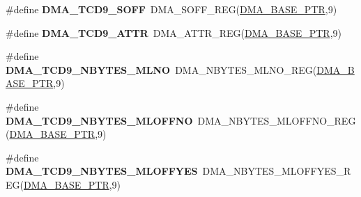 \begin{DoxyCompactItemize}
\item 
\hypertarget{group___d_m_a___register___accessor___macros_ga9fa3ee648910ce0b3f958f9fba8109bd}{}\#define {\bfseries D\+M\+A\+\_\+\+T\+C\+D9\+\_\+\+S\+O\+F\+F}~D\+M\+A\+\_\+\+S\+O\+F\+F\+\_\+\+R\+E\+G(\hyperlink{group___d_m_a___peripheral_ga6997fbc1b1973e9f27170217a3bd6f22}{D\+M\+A\+\_\+\+B\+A\+S\+E\+\_\+\+P\+T\+R},9)\label{group___d_m_a___register___accessor___macros_ga9fa3ee648910ce0b3f958f9fba8109bd}

\item 
\hypertarget{group___d_m_a___register___accessor___macros_gab5bfe174e41a010fa81140945c342ef9}{}\#define {\bfseries D\+M\+A\+\_\+\+T\+C\+D9\+\_\+\+A\+T\+T\+R}~D\+M\+A\+\_\+\+A\+T\+T\+R\+\_\+\+R\+E\+G(\hyperlink{group___d_m_a___peripheral_ga6997fbc1b1973e9f27170217a3bd6f22}{D\+M\+A\+\_\+\+B\+A\+S\+E\+\_\+\+P\+T\+R},9)\label{group___d_m_a___register___accessor___macros_gab5bfe174e41a010fa81140945c342ef9}

\item 
\hypertarget{group___d_m_a___register___accessor___macros_ga2e2580532266e2bfb8626521ed50bf5d}{}\#define {\bfseries D\+M\+A\+\_\+\+T\+C\+D9\+\_\+\+N\+B\+Y\+T\+E\+S\+\_\+\+M\+L\+N\+O}~D\+M\+A\+\_\+\+N\+B\+Y\+T\+E\+S\+\_\+\+M\+L\+N\+O\+\_\+\+R\+E\+G(\hyperlink{group___d_m_a___peripheral_ga6997fbc1b1973e9f27170217a3bd6f22}{D\+M\+A\+\_\+\+B\+A\+S\+E\+\_\+\+P\+T\+R},9)\label{group___d_m_a___register___accessor___macros_ga2e2580532266e2bfb8626521ed50bf5d}

\item 
\hypertarget{group___d_m_a___register___accessor___macros_gab692893ea10469e543391d042aad45e1}{}\#define {\bfseries D\+M\+A\+\_\+\+T\+C\+D9\+\_\+\+N\+B\+Y\+T\+E\+S\+\_\+\+M\+L\+O\+F\+F\+N\+O}~D\+M\+A\+\_\+\+N\+B\+Y\+T\+E\+S\+\_\+\+M\+L\+O\+F\+F\+N\+O\+\_\+\+R\+E\+G(\hyperlink{group___d_m_a___peripheral_ga6997fbc1b1973e9f27170217a3bd6f22}{D\+M\+A\+\_\+\+B\+A\+S\+E\+\_\+\+P\+T\+R},9)\label{group___d_m_a___register___accessor___macros_gab692893ea10469e543391d042aad45e1}

\item 
\hypertarget{group___d_m_a___register___accessor___macros_ga1a9eab72523f41a399f2f7201429d28d}{}\#define {\bfseries D\+M\+A\+\_\+\+T\+C\+D9\+\_\+\+N\+B\+Y\+T\+E\+S\+\_\+\+M\+L\+O\+F\+F\+Y\+E\+S}~D\+M\+A\+\_\+\+N\+B\+Y\+T\+E\+S\+\_\+\+M\+L\+O\+F\+F\+Y\+E\+S\+\_\+\+R\+E\+G(\hyperlink{group___d_m_a___peripheral_ga6997fbc1b1973e9f27170217a3bd6f22}{D\+M\+A\+\_\+\+B\+A\+S\+E\+\_\+\+P\+T\+R},9)\label{group___d_m_a___register___accessor___macros_ga1a9eab72523f41a399f2f7201429d28d}


\end{DoxyCompactItemize}

